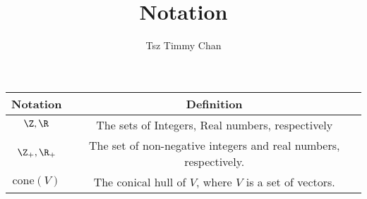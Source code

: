 \documentclass{TC}
\title{Notation}	%
\author{Tsz Timmy Chan}	%
\begin{document}
\begin{center}
\begin{tabular}{c|c}
\textbf{Notation} & \textbf{Definition}  \\ \hline \hline
$\Z, \R$ & The sets of Integers, Real numbers, respectively \\\hline
$\Z_+, \R_+$ & The set of non-negative integers and real numbers, respectively. \\\hline
$\mathrm{cone}(V)$ & The conical hull of $V$, where $V$ is a set of vectors.\\ 
\end{tabular}
\end{center}
\end{document}
